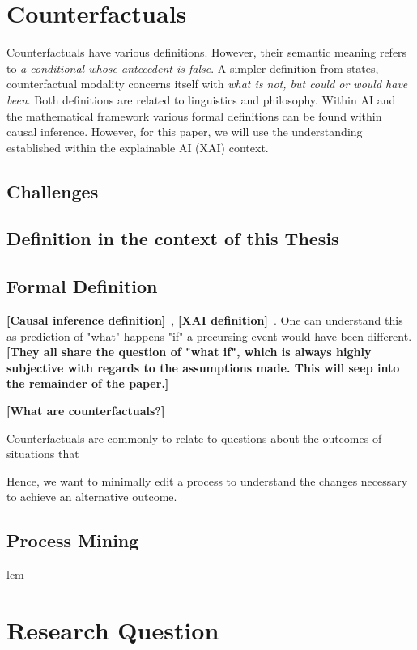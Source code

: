 \documentclass[12pt,a4paper,footinclude=true,headinclude=true]{report}
\newcommand{\attention}[1]{\color{red}\textbf{[#1]}\color{black}~}
\begin{document}
\section{Counterfactuals}

Counterfactuals have various definitions. However, their semantic meaning refers to \emph{a conditional whose antecedent is false}\autocite{_Counterfactual_}. A simpler definition from \citeauthor{starr_Counterfactuals_2021} states, counterfactual modality concerns itself with \emph{what is not, but could or would have been}.
Both definitions are related to linguistics and philosophy. Within AI and the mathematical framework various formal definitions can be found within causal inference\autocite{hitchcock_CausalModels_2020}. However, for this paper, we will use the understanding established within the explainable AI (XAI) context. 
\subsection{Challenges}
\subsection{Definition in the context of this Thesis}
\subsection{Formal Definition}


\attention{Causal inference definition}, \attention{XAI definition}. 
One can understand this as prediction of "what" happens "if" a precursing event would have been different.  
\attention{They all share the question of "what if", which is always highly subjective with regards to the assumptions made. This will seep into the remainder of the paper.}

\attention{What are counterfactuals?}

Counterfactuals are commonly to relate to questions about the outcomes of situations that  

Hence, we want to minimally edit a process to understand the changes necessary to achieve an alternative outcome.

\subsection{Process Mining}
\acrfull{lcm}

\section{Research Question}
\end{document}
